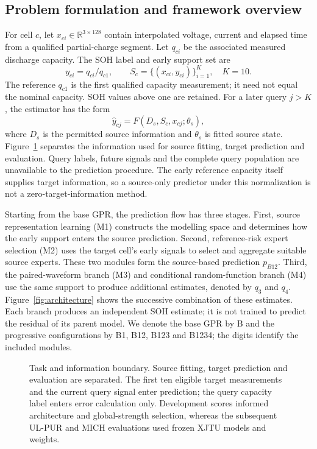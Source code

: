 \documentclass[preprint,12pt]{elsarticle}
\newcommand{\R}{\mathbb{R}}
\begin{document}
\subsection{Problem formulation and framework overview}
For cell $c$, let $x_{ci}\in\R^{3\times128}$ contain interpolated voltage, current and elapsed time from a qualified partial-charge segment. Let $q_{ci}$ be the associated measured discharge capacity. The SOH label and early support set are
\begin{equation}
y_{ci}=q_{ci}/q_{c1},\qquad S_c=\{(x_{ci},y_{ci})\}_{i=1}^{K},\quad K=10.
\end{equation}
The reference $q_{c1}$ is the first qualified capacity measurement; it need not equal the nominal capacity. SOH values above one are retained. For a later query $j>K$, the estimator has the form
\begin{equation}
\widehat y_{cj}=F(D_s,S_c,x_{cj};\theta_s),
\label{eq:permission}
\end{equation}
where $D_s$ is the permitted source information and $\theta_s$ is fitted source state. Figure~\ref{fig:permission} separates the information used for source fitting, target prediction and evaluation. Query labels, future signals and the complete query population are unavailable to the prediction procedure. The early reference capacity itself supplies target information, so a source-only predictor under this normalization is not a zero-target-information method.

Starting from the base GPR, the prediction flow has three stages. First, source representation learning (M1) constructs the modelling space and determines how the early support enters the source prediction. Second, reference-risk expert selection (M2) uses the target cell's early signals to select and aggregate suitable source experts. These two modules form the source-based prediction $p_{B12}$. Third, the paired-waveform branch (M3) and conditional random-function branch (M4) use the same support to produce additional estimates, denoted by $q_3$ and $q_4$. Figure~\ref{fig:architecture} shows the successive combination of these estimates. Each branch produces an independent SOH estimate; it is not trained to predict the residual of its parent model. We denote the base GPR by B and the progressive configurations by B1, B12, B123 and B1234; the digits identify the included modules.

\begin{figure}[!htbp]\centering
\resizebox{.92\columnwidth}{!}{}
\caption{Task and information boundary. Source fitting, target prediction and evaluation are separated. The first ten eligible target measurements and the current query signal enter prediction; the query capacity label enters error calculation only. Development scores informed architecture and global-strength selection, whereas the subsequent UL-PUR and MICH evaluations used frozen XJTU models and weights.}\label{fig:permission}
\end{figure}
\end{document}
